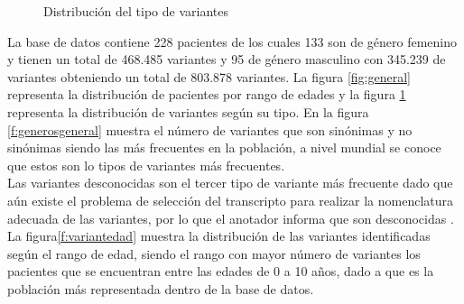 \begin{figure}[H]
	\centering
	\caption{Distribución del tipo de variantes}
	\label{f:variantesgeneral}
\end{figure}

La base de datos contiene 228 pacientes de los cuales 133 son de género femenino y tienen un total de 468.485 variantes y 95 de género masculino con 345.239 de variantes obteniendo  un total de 803.878 variantes. La  figura \ref{fig:general} representa la distribución de pacientes por rango de edades y la figura \ref{f:variantesgeneral} representa la distribución de variantes según su tipo. En la figura \ref{f:generosgeneral} muestra el número de variantes que son sinónimas y no sinónimas siendo las más frecuentes en la población, a  nivel mundial se conoce que estos son lo tipos de variantes más frecuentes\cite{Fu2013}.\\

Las variantes desconocidas son el tercer tipo de variante más frecuente dado que aún existe el problema de selección del transcripto para realizar la nomenclatura adecuada de las variantes, por lo que el anotador informa que son desconocidas \cite{McCarthy2014}. La figura\ref{f:variantedad} muestra la distribución de las variantes identificadas según el rango de edad, siendo el rango con mayor número de variantes los pacientes que se encuentran entre las edades de 0 a 10 años, dado a que es la población más representada dentro de la base de datos. \\

